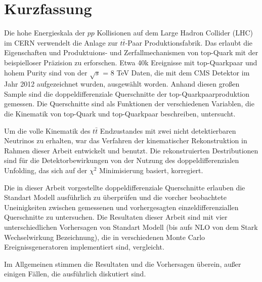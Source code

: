 \thispagestyle{empty}
\vspace{-3cm}
\section*{\centering Kurzfassung}

\vspace{\baselineskip}

Die hohe Energieskala der $pp$ Kollisionen auf dem Large Hadron Collider (LHC) im CERN verwendelt 
die Anlage zur $t\bar{t}$-Paar Produktionsfabrik. Das erlaubt die Eigenschaften und
Produktuions- und Zerfallmechanismen von top-Quark mit der beispielloser Pr{\"a}zision zu erforschen.
Etwa 40k Ereignisse mit top-Quarkpaar und hohem Purity sind von der $\sqrt{s}$ = 8 TeV
Daten, die mit dem CMS Detektor im Jahr 2012 aufgezeichnet wurden, ausgew{\"a}hlt worden. 
Anhand diesen gro{\ss}en Sample sind die doppeldifferenziale Querschnitte der top-Quarkpaarproduktion
gemessen. Die Querschnitte sind als Funktionen der verschiedenen Variablen, die die Kinematik von
top-Quark und top-Quarkpaar beschreiben, untersucht.

Um die volle Kinematik des $t\bar{t}$ Endzustandes mit zwei nicht detektierbaren Neutrinos 
zu erhalten, war das Verfahren der kinematischer Rekonstruktion in Rahmen dieser Arbeit entwickelt und benutzt. 
Die rekonstruierten Destributionen sind f{\"u}r die Detektorbewirkungen von der Nutzung des doppeldifferenzialen
Unfolding, das sich auf der $\chi^{2}$ Minimisierung basiert, korregiert.

Die in dieser Arbeit vorgestellte doppeldifferenziale Querschnitte erlauben die Standart Modell ausf{\"u}hrlich 
zu {\"u}berpr{\"u}fen und die vorcher beobachtete Uneinigkeiten zwischen gemessenen und vorhergesagten einzeldifferenziallen
Querschnitte zu untersuchen. Die Resultaten dieser Arbeit sind mit vier unterschiedlichen Vorhersagen von
Standart Modell (bis aufs NLO von dem Stark Wechselwirkung Bezeichnung), die in verschiedenen Monte Carlo 
Ereignissgeneratoren implementiert sind, vergleicht.

Im Allgemeinen stimmen die Resultaten und die Vorhersagen {\"u}berein, au{\ss}er einigen F{\"a}llen, die ausf{\"u}hrlich
diskutiert sind.

